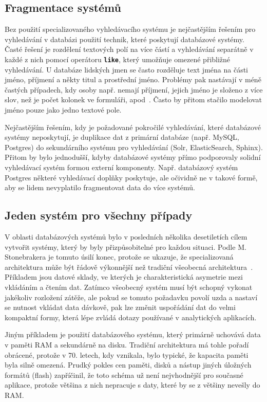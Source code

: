 \documentclass[11pt,letterpaper,oneside,openright]{book}
\newcommand{\bftt}[1]{\texttt{\textbf{#1}}}
\begin{document}
\subsection{Fragmentace systémů}
Bez použití specializovaného vyhledávacího systému je nejčastějším řešením pro
vyhledávání v databázi použití technik, které poskytují databázové systémy.
Časté řešení je rozdělení textových polí na více částí a vyhledávání separátně
v každé z nich pomocí operátoru \bftt{like}, který umožňuje omezené přibližné
vyhledávání. U databáze lidských jmen se často rozděluje text jména na části
jméno, příjmení a někty titul a prostřední jméno. Problémy pak nastávají v méně
častých případech, kdy osoby např. nemají příjmení, jejich jméno je složeno z
více slov, než je počet kolonek ve formuláři, apod~\cite{name_falsehoods}.
Často by přitom stačilo modelovat jméno pouze jako jedno textové pole.

Nejčastějším řešením, kdy je požadované pokročilé vyhledávání, které databázové
systémy neposkytují, je duplikace dat z primární databáze (např. MySQL,
Postgres) do sekundárního systému pro vyhledávání (Solr, ElasticSearch,
Sphinx). Přitom by bylo jednodušší, kdyby databázové systémy přímo podporovaly
solidní vyhledávací systém formou externí komponenty. Např. databázový systém
Postgres některé vyhledávací doplňky poskytuje, ale očividně ne v takové formě,
aby se lidem nevyplatilo fragmentovat data do více systémů. 


\subsection{Jeden systém pro všechny případy}
V oblasti databázových systémů bylo v posledních několika desetiletích cílem
vytvořit systémy, který by byly přizpůsobitelné pro každou situaci. Podle M.
Stonebrakera je tomuto úsilí konec, protože se ukazuje, že specializovaná
architektura může být řádově výkonnější než tradiční všeobecná
architektura~\cite{Stonebraker:2005:OSF:1053724.1054024}. Příkladem jsou datové
sklady, ve kterých je charakteristická asymetrie mezi vkládáním a čtením dat.
Zatímco všeobecný systém musí být schopný vykonat jakékoliv rozložení zátěže,
ale pokud se tomuto požadavku povolí uzda a nastaví se nutnost vkládat data
dávkově, pak lze změnit uspořádání dat do velmi kompaktní formy, která lépe
zvládá dotazy používané v analytických aplikacích.

Jiným příkladem je použití databázového systému, který primárně uchovává data v
paměti RAM a sekundárně na disku. Tradiční architektura má tohle pořadí
obrácené, protože v 70. letech, kdy vznikala, bylo typické, že kapacita paměti
byla silně omezená. Prudký pokles cen paměti, disků a nástup jiných úložných
formátů (flash) zapříčinil, že toto schéma už není nejvhodnější pro současné
aplikace, protože většina z nich nepracuje s daty, které by se z většiny
nevešly do RAM.
\end{document}
